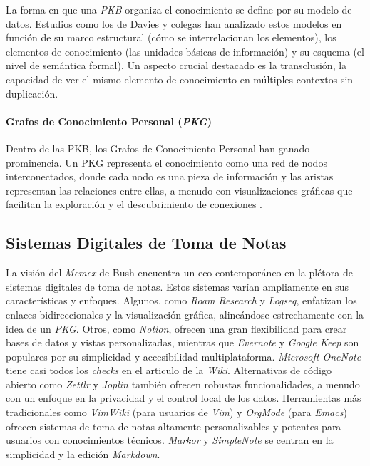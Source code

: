 \newpage

La forma en que una \textit{PKB} organiza el conocimiento se define por su modelo de datos. Estudios como los de Davies y colegas \parencite{daviesBuildingMemexSixty2005, daviesStillBuildingMemex2011} han analizado estos modelos en función de su marco estructural (cómo se interrelacionan los elementos), los elementos de conocimiento (las unidades básicas de información) y su esquema (el nivel de semántica formal). Un aspecto crucial destacado es la transclusión, la capacidad de ver el mismo elemento de conocimiento en múltiples contextos sin duplicación.

\paragraph{Grafos de Conocimiento Personal (\textit{PKG})}
Dentro de las PKB, los Grafos de Conocimiento Personal han ganado prominencia. Un PKG representa el conocimiento como una red de nodos interconectados, donde cada nodo es una pieza de información y las aristas representan las relaciones entre ellas, a menudo con visualizaciones gráficas que facilitan la exploración y el descubrimiento de conexiones \parencite{pyneMetaworkHowWe2022}.

\subsection{Sistemas Digitales de Toma de Notas}
\label{subsec:sistemas_digitales_toma_notas}
La visión del \textit{Memex} de Bush encuentra un eco contemporáneo en la plétora de sistemas digitales de toma de notas. Estos sistemas varían ampliamente en sus características y enfoques. Algunos, como \textit{Roam Research} y \textit{Logseq}, enfatizan los enlaces bidireccionales y la visualización gráfica, alineándose estrechamente con la idea de un \textit{PKG}. Otros, como \textit{Notion}, ofrecen una gran flexibilidad para crear bases de datos y vistas personalizadas, mientras que \textit{Evernote} y \textit{Google Keep} son populares por su simplicidad y accesibilidad multiplataforma. \textit{Microsoft OneNote} tiene casi todos los \textit{checks} en el articulo de la \textit{Wiki}. Alternativas de código abierto como \textit{Zettlr} y \textit{Joplin} también ofrecen robustas funcionalidades, a menudo con un enfoque en la privacidad y el control local de los datos. Herramientas más tradicionales como \textit{VimWiki} (para usuarios de \textit{Vim}) y \textit{OrgMode} (para \textit{Emacs}) ofrecen sistemas de toma de notas altamente personalizables y potentes para usuarios con conocimientos técnicos. \textit{Markor} y \textit{SimpleNote} se centran en la simplicidad y la edición \textit{Markdown}.

